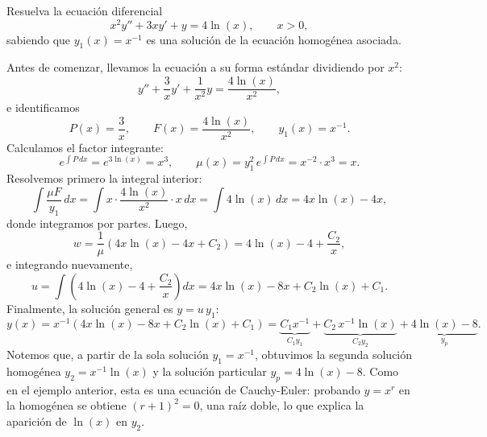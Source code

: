 \begin{example}
    Resuelva la ecuaci\'on diferencial
    \[
    x^2y''+3xy'+y=4\ln(x),\qquad x>0,
    \]
    sabiendo que $y_1(x)=x^{-1}$ es una soluci\'on de la ecuaci\'on homog\'enea asociada.

    Antes de comenzar, llevamos la ecuaci\'on a su forma est\'andar dividiendo por $x^2$:
    \[
    y''+\dfrac{3}{x}y'+\dfrac{1}{x^2}y=\dfrac{4\ln(x)}{x^2},
    \]
    e identificamos
    \[
    P(x)=\dfrac{3}{x},\qquad F(x)=\dfrac{4\ln(x)}{x^2},\qquad y_1(x)=x^{-1}.
    \]
    Calculamos el factor integrante:
    \[
    e^{\int P\,dx}=e^{3\ln(x)}=x^3,\qquad \mu(x)=y_1^2\,e^{\int P\,dx}=x^{-2}\cdot x^3=x.
    \]
    Resolvemos primero la integral interior:
    \[
    \int\dfrac{\mu F}{y_1}\,dx=\int x\cdot\dfrac{4\ln(x)}{x^2}\cdot x\,dx=\int4\ln(x)\,dx=4x\ln(x)-4x,
    \]
    donde integramos por partes. Luego,
    \[
    w=\dfrac{1}{\mu}\left(4x\ln(x)-4x+C_2\right)=4\ln(x)-4+\dfrac{C_2}{x},
    \]
    e integrando nuevamente,
    \[
    u=\int\left(4\ln(x)-4+\dfrac{C_2}{x}\right)dx=4x\ln(x)-8x+C_2\ln(x)+C_1.
    \]
    Finalmente, la soluci\'on general es $y=u\,y_1$:
    \[
    y(x)=x^{-1}\left(4x\ln(x)-8x+C_2\ln(x)+C_1\right)=\underbrace{C_1x^{-1}}_{C_1y_1}+\underbrace{C_2\,x^{-1}\ln(x)}_{C_2y_2}+\underbrace{4\ln(x)-8}_{y_p}.
    \]
    Notemos que, a partir de la sola soluci\'on $y_1=x^{-1}$, obtuvimos la segunda soluci\'on homog\'enea $y_2=x^{-1}\ln(x)$ y la soluci\'on particular $y_p=4\ln(x)-8$. Como en el ejemplo anterior, esta es una ecuaci\'on de Cauchy-Euler: probando $y=x^r$ en la homog\'enea se obtiene $(r+1)^2=0$, una ra\'iz doble, lo que explica la aparici\'on de $\ln(x)$ en $y_2$.
\end{example}

